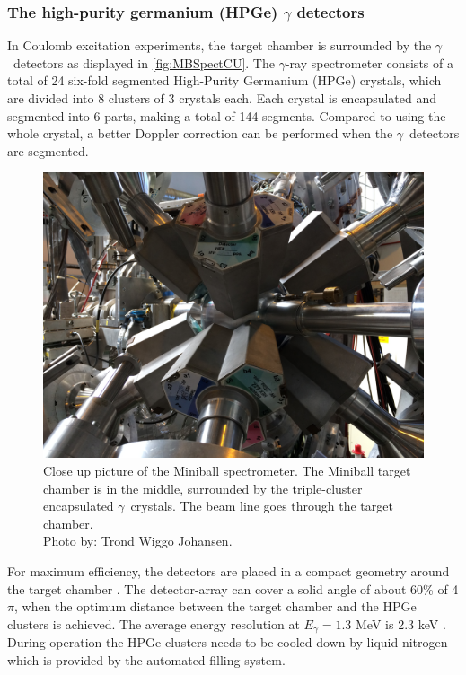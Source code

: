 \documentclass[twoside,english]{uiofysmaster/uiofysmaster}
\newcommand{\ga}{$\gamma$}
\let\orgautoref\autoref
\renewcommand{\autoref}
        {%
		 \def\sectionautorefname{Section}%
		 \def\subsectionautorefname{Section}%
		 \def\subsubsectionautorefname{Section}%
		 \def\chapterautorefname{Chapter}%
          \orgautoref}
\begin{document}
\subsubsection{The high-purity germanium (HPGe) \texorpdfstring{$\gamma$}{Gamma} detectors}
In Coulomb excitation experiments, the target chamber is surrounded by the \ga\ detectors as displayed in \autoref{fig:MBSpectCU}. 
The \ga-ray spectrometer consists of a total of 24 six-fold segmented High-Purity Germanium (HPGe) crystals, which are divided into 8 clusters of 3 crystals each. 
Each crystal is encapsulated and segmented into 6 parts, making a total of 144 segments. 
Compared to using the whole crystal, a better Doppler correction can be performed when the \ga\ detectors are segmented. 

\begin{figure}[ht]
	\centering
	\includegraphics[width=\linewidth]{Images/IMG3917.JPG}
	\caption{Close up picture of the Miniball spectrometer. The Miniball target chamber is in the middle, surrounded by the triple-cluster encapsulated \ga\ crystals. The beam line goes through the target chamber. \\ Photo by: Trond Wiggo Johansen.}
	\label{fig:MBSpectCU}
\end{figure}

For maximum efficiency, the detectors are placed in a compact geometry around the target chamber \cite{NWarr-HPGe, MB-spect}. 
The detector-array can cover a solid angle of about 60\% of 4$\pi$, when the optimum distance between the target chamber and the HPGe clusters is achieved. 
The average energy resolution at $E_\gamma = 1.3$ MeV is 2.3 keV \cite{Butler2017}. 
During operation the HPGe clusters needs to be cooled down by liquid nitrogen which is provided by the automated filling system. 
\end{document}

